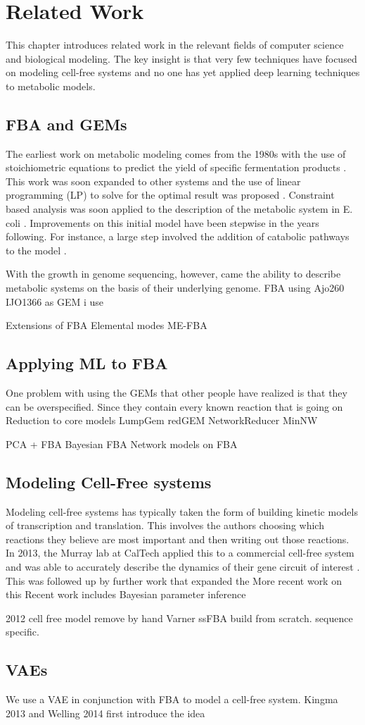 \chapter{Related Work} 
This chapter introduces related work in the relevant fields of computer science and biological modeling.
The key insight is that very few techniques have focused on modeling cell-free systems and no one has yet applied deep learning techniques to metabolic models.

\section{FBA and GEMs}
The earliest work on metabolic modeling comes from the 1980s with the use of stoichiometric equations to predict the yield of specific fermentation products \cite{papoutsakis1984equations}.
This work was soon expanded to other systems and the use of linear programming (LP) to solve for the optimal result was proposed \cite{fell1986fat}.
Constraint based analysis was soon applied to the description of the metabolic system in E. coli \cite{majewski1990simple}.
Improvements on this initial model have been stepwise in the years following.
For instance, a large step involved the addition of catabolic pathways to the model \cite{varma1993metabolic}.

With the growth in genome sequencing, however, came the ability to describe metabolic systems on the basis of their underlying genome.
FBA using Ajo260
IJO1366 as GEM i use

Extensions of FBA
Elemental modes
ME-FBA

\section{Applying ML to FBA}
One problem with using the GEMs that other people have realized is that they can be overspecified.
Since they contain every known reaction that is going on
Reduction to core models
	LumpGem
	redGEM
	NetworkReducer
	MinNW

PCA + FBA
Bayesian FBA
Network models on FBA

\section{Modeling Cell-Free systems}\label{rw:mod-cf}
Modeling cell-free systems has typically taken the form of building kinetic models of transcription and translation.
This involves the authors choosing which reactions they believe are most important and then writing out those reactions.
In 2013, the Murray lab at CalTech applied this to a commercial cell-free system and was able to accurately describe the dynamics of their gene circuit of interest \cite{tuza2013silico}.
This was followed up by further work that expanded the \cite{wayman2015dynamic}
More recent work on this Recent work includes Bayesian parameter inference \cite{moore2018rapid}

2012 cell free model remove by hand \cite{bujara2012silico}
Varner ssFBA build from scratch. sequence specific. \cite{vilkhovoy2017sequence}

\section{VAEs}
We use a VAE in conjunction with FBA to model a cell-free system.
Kingma 2013 and Welling 2014 first introduce the idea